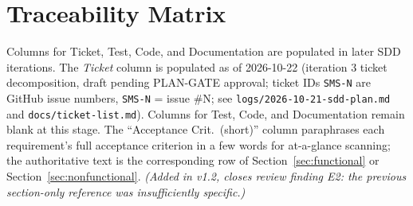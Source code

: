 \documentclass[11pt,a4paper]{article}
\begin{document}
\section{Traceability Matrix}
\label{sec:traceability}

Columns for Ticket, Test, Code, and Documentation are populated in later SDD
iterations. The \emph{Ticket} column is populated as of 2026-10-22 (iteration 3
ticket decomposition, draft pending PLAN-GATE approval; ticket IDs
\texttt{SMS-N} are GitHub issue numbers, \texttt{SMS-N} = issue \#N; see
\texttt{logs/2026-10-21-sdd-plan.md} and \texttt{docs/ticket-list.md}).
Columns for Test, Code, and Documentation remain blank at this stage. The
``Acceptance Crit.\ (short)'' column paraphrases each requirement's full
acceptance criterion in a few words for at-a-glance scanning; the
authoritative text is the corresponding row of Section~\ref{sec:functional}
or Section~\ref{sec:nonfunctional}.
\emph{(Added in v1.2, closes review finding E2: the previous
section-only reference was insufficiently specific.)}
\end{document}
